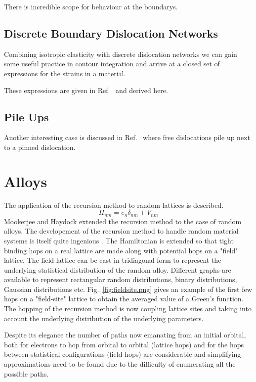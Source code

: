 There is incredible scope for behaviour at the boundarys.

\subsection{Discrete Boundary Dislocation Networks}
Combining isotropic elasticity with discrete dislocation networks
we can gain some useful practice in contour integration and arrive
at a closed set of expressions for the strains in a material. 

These expressions are given in Ref.~\cite{sutton95} and derived here.

\subsection{Pile Ups}
Another interesting case is discussed in Ref.~\cite{eshelby} 
where free dislocations pile up next to a pinned dislocation.

\section{Alloys}
The application of the recursion method to random lattices is described.
\cite{glaser81}
%
\begin{equation}
H_{nm} = e_{n}\delta_{nm} + V_{nm}
\end{equation}
%
Mookerjee and Haydock extended the recursion method to the case of random alloys.
The developement of the recursion method to handle random material systems is 
itself quite ingenious \cite{mookerjee, haydock74}. The Hamiltonian is extended
so that tight binding hops on a real lattice are made along with potential hops
on a "field" lattice. The field lattice can be cast in tridiagonal form to represent
the underlying statistical distribution of the random alloy. Different graphs are available
to represent rectangular random distributions, binary distributions, Gaussian distributions
etc. Fig.~\ref{fig:fieldsite.png} gives an example of the first few hops on a "field-site" 
lattice to obtain the averaged value of a Green's function. The hopping of the recursion method
is now coupling lattice sites and taking into account the underlying distribution of 
the underlying parameters.

Despite its elegance the number of paths now emanating from an initial orbital, both
for electrons to hop from orbital to orbital (lattice hops) and for the hops between 
statistical configurations (field hops) are considerable and simplifying approximations 
need to be found due to the difficulty of enumerating all the possible paths.

